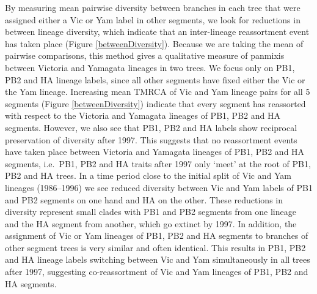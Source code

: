 \documentclass[11pt,oneside,letterpaper]{article}
\begin{document}
By measuring mean pairwise diversity between branches in each tree that were assigned either a Vic or Yam label in other segments, we look for reductions in between lineage diversity, which indicate that an inter-lineage reassortment event has taken place (Figure \ref{betweenDiversity}).
Because we are taking the mean of pairwise comparisons, this method gives a qualitative measure of panmixis between Victoria and Yamagata lineages in two trees.
We focus only on PB1, PB2 and HA lineage labels, since all other segments have fixed either the Vic or the Yam lineage.
Increasing mean TMRCA of Vic and Yam lineage pairs for all 5 segments (Figure \ref{betweenDiversity}) indicate that every segment has reassorted with respect to the Victoria and Yamagata lineages of PB1, PB2 and HA segments.
However, we also see that PB1, PB2 and HA labels show reciprocal preservation of diversity after 1997.
This suggests that no reassortment events have taken place between Victoria and Yamagata lineages of PB1, PB2 and HA segments, i.e.\ PB1, PB2 and HA traits after 1997 only `meet' at the root of PB1, PB2 and HA trees.
In a time period close to the initial split of Vic and Yam lineages (1986--1996) we see reduced diversity between Vic and Yam labels of PB1 and PB2 segments on one hand and HA on the other.
These reductions in diversity represent small clades with PB1 and PB2 segments from one lineage and the HA segment from another, which go extinct by 1997.
In addition, the assignment of Vic or Yam lineages of PB1, PB2 and HA segments to branches of other segment trees is very similar and often identical.
This results in PB1, PB2 and HA lineage labels switching between Vic and Yam simultaneously in all trees after 1997, suggesting co-reassortment of Vic and Yam lineages of PB1, PB2 and HA segments. 
\end{document}
